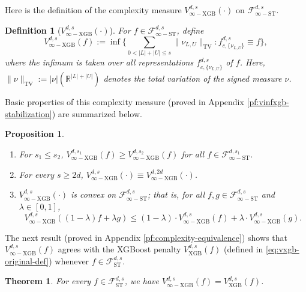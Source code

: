 \documentclass[10pt]{article}
\newtheorem{theorem}{Theorem}
\newtheorem{proposition}{Proposition}
\newtheorem{definition}{Definition}
\newcommand{\F}{{\mathcal{F}}}
\newcommand{\R}{{\mathbb R}}
\newcommand{\fst}{{\mathcal{F}^{d, s}_{\text{ST}}}}
\newcommand{\fstinf}{{\mathcal{F}^{d, s}_{\infty-\text{ST}}}}
\newcommand{\vxgb}{{V^{d, s}_{\text{XGB}}}}
\newcommand{\vinfxgb}{{V^{d, s}_{\infty-\text{XGB}}}}
\newcommand{\fcnu}{{f^{d, s}_{c, \{\nu_{L, U}\}}}}
\begin{document}
Here is the definition of the complexity measure $\vinfxgb(\cdot)$ 
on $\fstinf$. 

\begin{definition}[$\vinfxgb(\cdot)$]
    For $f \in \fstinf$, define
    \begin{equation}\label{vinfxgb_def}
        \vinfxgb(f) := \inf \bigg\{ 
        \sum_{0 < |L| + |U| \le s} \|\nu_{L, U}\|_{\text{TV}}: 
        \fcnu \equiv f \bigg\},
    \end{equation}
    where the infimum is taken over all representations 
    $\fcnu$ of $f$. Here, 
    $\|\nu\|_{\text{TV}} := |\nu|(\R^{|L| + |U|})$ denotes the 
    total variation of the signed measure $\nu$. 
\end{definition}
Basic properties of this complexity measure (proved in 
Appendix \ref{pf:vinfxgb-stabilization}) are summarized below.
\begin{proposition}\label{prop:vinfxgb-stabilization}
\begin{enumerate}[label = (\alph*)]
    \item For $s_1 \le s_2$, 
    $V^{d, s_1}_{\infty-\text{XGB}}(f) 
    \ge V^{d, s_2}_{\infty-\text{XGB}}(f)$ for all 
    $f \in \F^{d, s_1}_{\infty-\text{ST}}$.
    \item For every $s \ge 2d$, 
    $V^{d, s}_{\infty-\text{XGB}}(\cdot) 
    \equiv V^{d, 2d}_{\infty-\text{XGB}}(\cdot)$.
    \item $\vinfxgb(\cdot)$ is convex on $\fstinf$; that is, 
    for all $f, g \in \fstinf$ and $\lambda \in [0, 1]$, 
    \begin{equation*}
        \vinfxgb((1 - \lambda) f + \lambda g) 
        \le (1 - \lambda) \cdot \vinfxgb(f) 
        + \lambda \cdot \vinfxgb(g).
    \end{equation*}
\end{enumerate}
\end{proposition}
The next result (proved in Appendix \ref{pf:complexity-equivalence}) 
shows that $\vinfxgb(f)$ agrees with the XGBoost penalty $\vxgb(f)$ 
(defined in \eqref{eq:vxgb-original-def}) whenever $f \in \fst$.
\begin{theorem}\label{thm:complexity-equivalence}
    For every $f \in \fst$, we have $\vinfxgb(f) = \vxgb(f)$.
\end{theorem}
\end{document}
